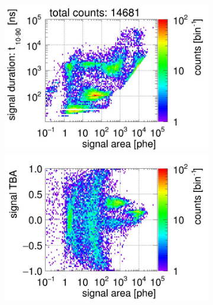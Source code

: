 \begin{landscape}
	
\begin{figure}[!p]
	\centering
	\begin{subfigure}[t]{0.33\textwidth} %
		\centering
		\includegraphics[width=\figurewidth,clip,trim={0 98 0 0}]{Figures/GasTest/CutsValid/res64767/pdpa03Vecfig64767.jpg}
		\includegraphics[width=\figurewidth,clip,trim={0 0 0 40}]{Figures/GasTest/CutsValid/res64767/tbapa03Vecfig64767.jpg}
		\caption{}
		\label{fig:signal selection 03}
	\end{subfigure}
	\begin{subfigure}[t]{0.33\textwidth}

\end{subfigure}
\end{figure}
\end{landscape}
